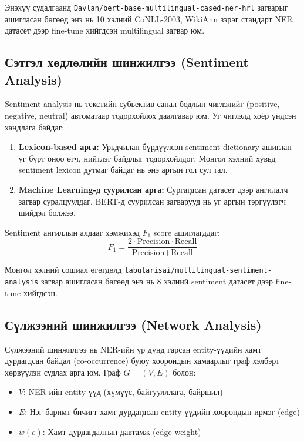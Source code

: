 Энэхүү судалгаанд \texttt{Davlan/bert-base-multilingual-cased-ner-hrl} загварыг ашигласан бөгөөд энэ нь 10 хэлний CoNLL-2003, WikiAnn зэрэг стандарт NER датасет дээр fine-tune хийгдсэн multilingual загвар юм.

\subsection{Сэтгэл хөдлөлийн шинжилгээ (Sentiment Analysis)}

Sentiment analysis нь текстийн субьектив санал бодлын чиглэлийг (positive, negative, neutral) автоматаар тодорхойлох даалгавар юм. Уг чиглэлд хоёр үндсэн хандлага байдаг:

\begin{enumerate}
    \item \textbf{Lexicon-based арга:} Урьдчилан бүрдүүлсэн sentiment dictionary ашиглан үг бүрт оноо өгч, нийтлэг байдлыг тодорхойлдог. Монгол хэлний хувьд sentiment lexicon дутмаг байдаг нь энэ аргын гол сул тал.
    \item \textbf{Machine Learning-д суурилсан арга:} Сургагдсан датасет дээр ангилалч загвар суралцуулдаг. BERT-д суурилсан загварууд нь уг аргын тэргүүлэгч шийдэл болжээ.
\end{enumerate}

Sentiment ангиллын алдааг хэмжихэд $F_1$ score ашиглагддаг:
\begin{equation}
    F_1 = \frac{2 \cdot \text{Precision} \cdot \text{Recall}}{\text{Precision} + \text{Recall}}
\end{equation}

Монгол хэлний сошиал өгөгдөлд \texttt{tabularisai/multilingual-sentiment-analysis} загвар ашигласан бөгөөд энэ нь 8 хэлний sentiment датасет дээр fine-tune хийгдсэн.

\subsection{Сүлжээний шинжилгээ (Network Analysis)}

Сүлжээний шинжилгээ нь NER-ийн үр дүнд гарсан entity-үүдийн хамт дурдагдсан байдал (co-occurrence) буюу хоорондын хамаарлыг граф хэлбэрт хөрвүүлэн судлах арга юм. Граф $G = (V, E)$ болон:
\begin{itemize}
    \item $V$: NER-ийн entity-үүд (хүмүүс, байгуулллага, байршил)
    \item $E$: Нэг баримт бичигт хамт дурдагдсан entity-үүдийн хоорондын ирмэг (edge)
    \item $w(e)$: Хамт дурдагдалтын давтамж (edge weight)
\end{itemize}

